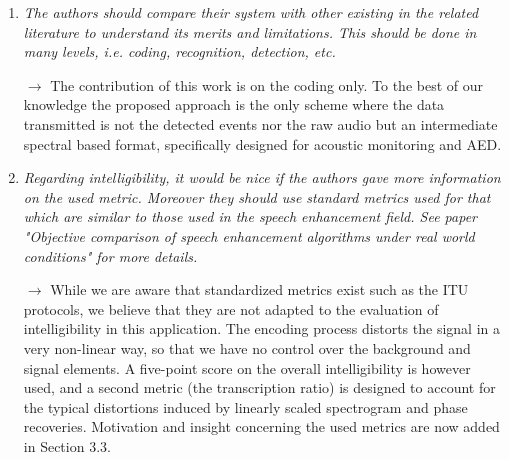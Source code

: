 \documentclass[10pt]{article}
\begin{document}
\begin{enumerate}
\item \emph{The authors should compare their system with other existing in the related literature to understand its merits and limitations. This should be done in many levels, i.e. coding, recognition, detection, etc.}

$\rightarrow$ The contribution of this work is on the coding only. To the best of our knowledge the proposed approach is the only scheme where the data transmitted is not the detected events nor the raw audio but an intermediate spectral based format, specifically designed for acoustic monitoring and AED.

\item \emph{Regarding intelligibility, it would be nice if the authors gave more information on the used metric. Moreover they should use standard metrics used for that which are similar to those used in the speech enhancement field. See paper "Objective comparison of speech enhancement algorithms under real world conditions" for more details.}

$\rightarrow$ While we are aware that standardized metrics exist such as the ITU protocols, we believe that they are not adapted to the evaluation of intelligibility in this application. The encoding process distorts the signal in a very non-linear way, so that we have no control over the background and signal elements. A five-point score on the overall intelligibility is however used, and a second metric (the transcription ratio) is designed to account for the typical distortions induced by linearly scaled spectrogram and phase recoveries. Motivation and insight concerning the used metrics are now added in Section 3.3.

\end{enumerate}
\end{document}
